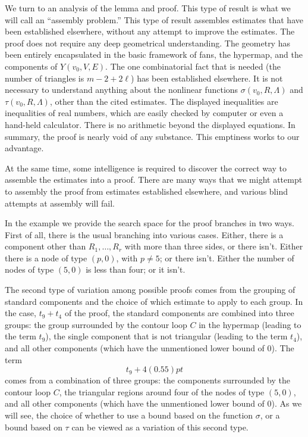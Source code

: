 We turn to an analysis of the lemma and proof.  This type of result is what
we will call an ``assembly problem.''  This type of result
assembles estimates that have been established elsewhere, without
any attempt to improve the estimates.  The proof
does not require any deep geometrical understanding.  The geometry
has been entirely encapsulated in the basic framework of
fans, the hypermap, and the components
of $Y(v_0,V,E)$.  The one combinatorial fact that is needed
(the number of triangles is $m-2+2\ell$) 
has been established elsewhere.  It is not necessary
to understand anything about the nonlinear functions $\sigma(v_0,R,\Lambda)$
and $\tau(v_0,R,\Lambda)$, other than the cited estimates.   
The displayed inequalities are inequalities of real numbers,
which are easily checked by computer
or even a hand-held calculator.  There is no arithmetic beyond
the displayed equations.
In summary,
the proof is nearly void of any substance.   This emptiness
works to our advantage.

At the same time, some intelligence is required to discover the
correct way to assemble the estimates into a proof.   There are
many ways that we might attempt to assembly the proof from estimates
established elsewhere, and various blind attempts at assembly will
fail.  

In the example we provide the search space for the proof
branches in two ways.  First of all, there is the usual branching
into various cases.  Either, there is a component other than
$R_1,\ldots,R_r$ with more than three sides, or there isn't.
Either there is a node of type $(p,0)$, with $p\ne 5$; or there isn't.
Either the number of nodes of type $(5,0)$ is less than four; or it isn't.

The second type of variation among possible proofs comes from
the grouping of standard components and the choice of which estimate
to apply to each group.  In the case, $t_9+t_4$ of the proof, the
standard components are combined into three groups:
the group surrounded by the contour loop $C$ in the hypermap
(leading to the term $t_9$), the single component that is not triangular
(leading to the term $t_4$), and all other components (which have
the unmentioned lower bound of $0$).  The term
   $$
   t_9 + 4(0.55)pt 
   $$
comes from a combination of three groups:
the components surrounded by the contour loop $C$, the triangular
regions around four of the nodes of type $(5,0)$, and all other
components (which have the unmentioned lower bound of $0$).
As we will see, the choice of whether to use a bound based on
the function $\sigma$, or a bound based on $\tau$ can be
viewed as a variation of this second type.

